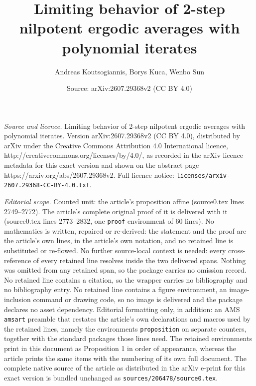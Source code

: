 \documentclass[10pt,a4paper]{amsart}
\title{Limiting behavior of 2-step nilpotent ergodic averages with polynomial iterates}
\author{Andreas Koutsogiannis, Borys Kuca, Wenbo Sun}
\date{Source: arXiv:2607.29368v2 (CC BY 4.0)}
\begin{document}
\maketitle

\noindent\emph{Source and licence.} Limiting behavior of 2-step nilpotent ergodic averages with polynomial iterates. Version arXiv:2607.29368v2 (CC BY 4.0), distributed by arXiv under the Creative Commons Attribution 4.0 International licence, http://creativecommons.org/licenses/by/4.0/, as recorded in the arXiv licence metadata for this exact version and shown on the abstract page https://arxiv.org/abs/2607.29368v2. Full licence notice: \texttt{licenses/arxiv-2607.29368-CC-BY-4.0.txt}.\par\smallskip

\noindent\textit{Editorial scope.} Counted unit: the article's proposition affine (source0.tex lines 2749--2772). The article's complete original proof of it is delivered with it (source0.tex lines 2773--2832, one \texttt{proof} environment of 60 lines). No mathematics is written, repaired or re-derived: the statement and the proof are the article's own lines, in the article's own notation, and no retained line is substituted or re-flowed.  No further source-local context is needed: every cross-reference of every retained line resolves inside the two delivered spans.  Nothing was omitted from any retained span, so the package carries no omission record.  No retained line contains a citation, so the wrapper carries no bibliography and no bibliography entry.  No retained line contains a figure environment, an image-inclusion command or drawing code, so no image is delivered and the package declares no asset dependency.  Editorial formatting only, in addition: an AMS \texttt{amsart} preamble that restates the article's own declarations and macros used by the retained lines, namely the environments \texttt{proposition} on separate counters, together with the standard packages those lines need.  The retained environments print in this document as Proposition 1 in order of appearance, whereas the article prints the same items with the numbering of its own full document.  The complete native source of the article as distributed in the arXiv e-print for this exact version is bundled unchanged as \texttt{sources/206478/source0.tex}.
\end{document}
